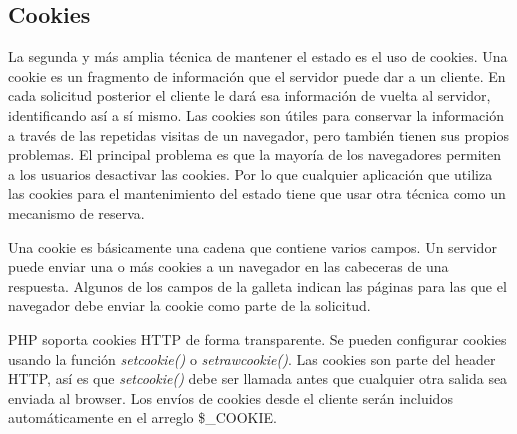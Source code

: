 \documentclass[a5paper,10pt,spanish]{sphinxmanual}
\begin{document}
\subsection{Cookies}
\label{Tutorial3_Sesiones.md:cookies}
La segunda y más amplia técnica de mantener el estado es el uso de
cookies. Una cookie es un fragmento de información que el servidor puede
dar a un cliente. En cada solicitud posterior el cliente le dará esa
información de vuelta al servidor, identificando así a sí mismo. Las
cookies son útiles para conservar la información a través de las
repetidas visitas de un navegador, pero también tienen sus propios
problemas. El principal problema es que la mayoría de los navegadores
permiten a los usuarios desactivar las cookies. Por lo que cualquier
aplicación que utiliza las cookies para el mantenimiento del estado
tiene que usar otra técnica como un mecanismo de reserva.

Una cookie es básicamente una cadena que contiene varios campos. Un
servidor puede enviar una o más cookies a un navegador en las cabeceras
de una respuesta. Algunos de los campos de la galleta indican las
páginas para las que el navegador debe enviar la cookie como parte de la
solicitud.

PHP soporta cookies HTTP de forma transparente. Se pueden configurar
cookies usando la función \emph{setcookie()} o \emph{setrawcookie()}. Las cookies
son parte del header HTTP, así es que \emph{setcookie()} debe ser llamada
antes que cualquier otra salida sea enviada al browser. Los envíos de
cookies desde el cliente serán incluidos automáticamente en el arreglo
\$\_COOKIE.
\end{document}
